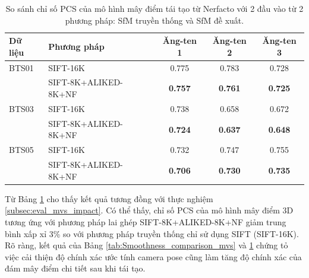      \label{subsec:eval_nerf_impact}
        \begin{table}[H]
            \centering
            \footnotesize
            \begin{tabular}{|l|l|c|c|c|}
            \hline
            \textbf{Dữ liệu} & \textbf{Phương pháp} & \textbf{Ăng-ten 1} & \textbf{Ăng-ten 2} & \textbf{Ăng-ten 3} \\
            \hline
            BTS01 & SIFT-16K & 0.775 & 0.783 & 0.728 \\
                  & SIFT-8K+ALIKED-8K+NF & \textbf{0.757} & \textbf{0.761} & \textbf{0.725}\\
            \hline
            BTS03 & SIFT-16K & 0.738 & 0.658 & 0.672 \\
                  & SIFT-8K+ALIKED-8K+NF & \textbf{0.724} & \textbf{0.637} &  \textbf{0.648}\\
            \hline
            BTS05 & SIFT-16K & 0.732 & 0.747 & 0.755 \\
                  & SIFT-8K+ALIKED-8K+NF & \textbf{0.706} & \textbf{0.730} & \textbf{0.735} \\
            \hline
            \end{tabular}
            \caption{So sánh chỉ số PCS của mô hình mây điểm tái tạo từ Nerfacto với 2 đầu vào từ 2 phương pháp: SfM truyền thống và SfM đề xuất.}
            \label{tab:Smoothness_comparison_nerf}
        \end{table}
    
    Từ Bảng \ref{tab:Smoothness_comparison_nerf} cho thấy kết quả tương đồng với thực nghiệm \ref{subsec:eval_mvs_impact}. Có thể thấy, chỉ số PCS của mô hình mây điểm 3D tương ứng với phương pháp lai ghép SIFT-8K+ALIKED-8K+NF giảm trung bình xấp xỉ 3\% so với phương pháp truyền thống chỉ sử dụng SIFT (SIFT-16K). Rõ ràng, kết quả của Bảng \ref{tab:Smoothness_comparison_mvs} và \ref{tab:Smoothness_comparison_nerf} chứng tỏ việc cải thiện độ chính xác ước tính camera pose cũng làm tăng độ chính xác của đám mây điểm chi tiết sau khi tái tạo.

